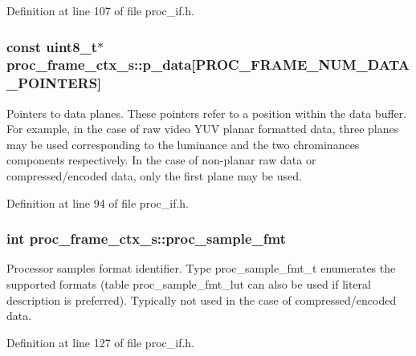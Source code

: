 Definition at line 107 of file proc\+\_\+if.\+h.

\subsubsection[{\texorpdfstring{p\+\_\+data}{p_data}}]{\setlength{\rightskip}{0pt plus 5cm}const uint8\+\_\+t$\ast$ proc\+\_\+frame\+\_\+ctx\+\_\+s\+::p\+\_\+data\mbox{[}P\+R\+O\+C\+\_\+\+F\+R\+A\+M\+E\+\_\+\+N\+U\+M\+\_\+\+D\+A\+T\+A\+\_\+\+P\+O\+I\+N\+T\+E\+RS\mbox{]}}\hypertarget{structproc__frame__ctx__s_ac6381b5fe9fa44fc575ab35a12e19a50}{}\label{structproc__frame__ctx__s_ac6381b5fe9fa44fc575ab35a12e19a50}
Pointers to data planes. These pointers refer to a position within the data buffer. For example, in the case of raw video Y\+UV planar formatted data, three planes may be used corresponding to the luminance and the two chrominances components respectively. In the case of non-\/planar raw data or compressed/encoded data, only the first plane may be used. 

Definition at line 94 of file proc\+\_\+if.\+h.

\subsubsection[{\texorpdfstring{proc\+\_\+sample\+\_\+fmt}{proc_sample_fmt}}]{\setlength{\rightskip}{0pt plus 5cm}int proc\+\_\+frame\+\_\+ctx\+\_\+s\+::proc\+\_\+sample\+\_\+fmt}\hypertarget{structproc__frame__ctx__s_aa68098f554e8a167b34d8454af44afda}{}\label{structproc__frame__ctx__s_aa68098f554e8a167b34d8454af44afda}
Processor samples format identifier. Type proc\+\_\+sample\+\_\+fmt\+\_\+t enumerates the supported formats (table proc\+\_\+sample\+\_\+fmt\+\_\+lut can also be used if literal description is preferred). Typically not used in the case of compressed/encoded data. 

Definition at line 127 of file proc\+\_\+if.\+h.

